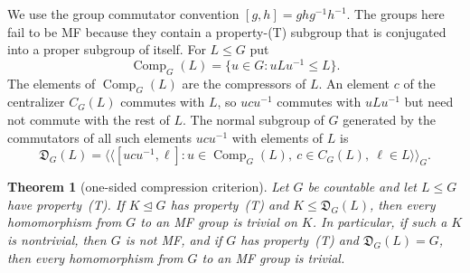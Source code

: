 \documentclass[11pt]{amsart}
\newcommand{\leanverified}[2]{\ignorespaces}
\theoremstyle{plain}
\newtheorem{mainthm}{Theorem}
\newcommand{\normal}[1]{\langle\!\langle #1\rangle\!\rangle}
\begin{document}
We use the group commutator convention $[g,h]=ghg^{-1}h^{-1}$.
The groups here fail to be MF because they contain a
property-\textup{(T)} subgroup that is conjugated into a proper subgroup of
itself.  For $L\le G$ put
\[
 \operatorname{Comp}_G(L)=\{u\in G:uLu^{-1}\le L\}.
\]
The elements of $\operatorname{Comp}_G(L)$ are the compressors of $L$.
An element $c$ of the centralizer $C_G(L)$ commutes with $L$, so $ucu^{-1}$
commutes with $uLu^{-1}$ but need not commute with the rest of $L$.  The
normal subgroup of $G$ generated by the commutators of all such elements
$ucu^{-1}$ with elements of $L$ is
\begin{equation}\label{eq:intrinsic-defect}
 \mathfrak D_G(L)
 =\normal{
   [ucu^{-1},\ell]:
   u\in\operatorname{Comp}_G(L),\ c\in C_G(L),\ \ell\in L
 }_G.
\end{equation}

\begin{mainthm}[one-sided compression criterion]
\label{thm:compression-criterion}
Let $G$ be countable and let $L\le G$ have property~\textup{(T)}.  If
$K\trianglelefteq G$ has property~\textup{(T)} and
$K\le\mathfrak D_G(L)$, then every homomorphism from $G$ to an MF group is
trivial on $K$.  In particular, if such a $K$ is nontrivial, then $G$ is
not MF, and
if $G$ has property~\textup{(T)} and $\mathfrak D_G(L)=G$, then every
homomorphism from $G$ to an MF group is trivial.
\leanverified{Manuscript/OneSidedMFRadical/PrintedCriterion}{GroupApproximation.Manuscript.OneSidedMFRadical.manuscriptOneSidedCompressionCriterion}
\leanverified{Manuscript/OneSidedMFRadical/PrintedCriterion}{GroupApproximation.Manuscript.OneSidedMFRadical.manuscriptFullRadicalKillsMFTargets}
\end{mainthm}
\end{document}
